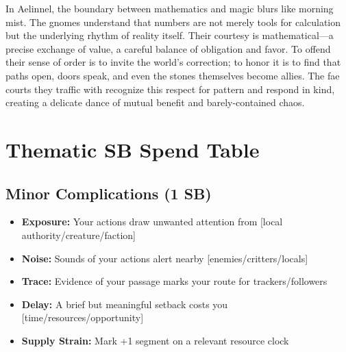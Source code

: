 \begin{tcolorbox}[colback=black!3,colframe=black!40!white,title={Numbers \& Nature}]
In Aelinnel, the boundary between mathematics and magic blurs like morning mist. The gnomes understand that numbers are not merely tools for calculation but the underlying rhythm of reality itself. Their courtesy is mathematical---a precise exchange of value, a careful balance of obligation and favor. To offend their sense of order is to invite the world's correction; to honor it is to find that paths open, doors speak, and even the stones themselves become allies. The fae courts they traffic with recognize this respect for pattern and respond in kind, creating a delicate dance of mutual benefit and barely-contained chaos.
\end{tcolorbox}


\section*{Thematic SB Spend Table}
\label{sec:thematic-sb}

\subsection*{Minor Complications (1 SB)}
\begin{itemize}
\item \textbf{Exposure:} Your actions draw unwanted attention from [local authority/creature/faction]
\item \textbf{Noise:} Sounds of your actions alert nearby [enemies/critters/locals]
\item \textbf{Trace:} Evidence of your passage marks your route for trackers/followers
\item \textbf{Delay:} A brief but meaningful setback costs you [time/resources/opportunity]
\item \textbf{Supply Strain:} Mark +1 segment on a relevant resource clock
\end{itemize}

